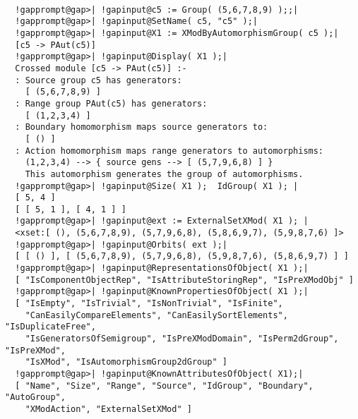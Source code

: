 \documentclass[a4paper,11pt]{report}
\begin{document}
{{ 
\begin{Verbatim}[commandchars=!@|,fontsize=\small,frame=single,label=Example]
  
  !gapprompt@gap>| !gapinput@c5 := Group( (5,6,7,8,9) );;|
  !gapprompt@gap>| !gapinput@SetName( c5, "c5" );|
  !gapprompt@gap>| !gapinput@X1 := XModByAutomorphismGroup( c5 );|
  [c5 -> PAut(c5)] 
  !gapprompt@gap>| !gapinput@Display( X1 );|
  Crossed module [c5 -> PAut(c5)] :-
  : Source group c5 has generators:
    [ (5,6,7,8,9) ]
  : Range group PAut(c5) has generators:
    [ (1,2,3,4) ]
  : Boundary homomorphism maps source generators to:
    [ () ]
  : Action homomorphism maps range generators to automorphisms:
    (1,2,3,4) --> { source gens --> [ (5,7,9,6,8) ] }
    This automorphism generates the group of automorphisms.
  !gapprompt@gap>| !gapinput@Size( X1 );  IdGroup( X1 ); |
  [ 5, 4 ]
  [ [ 5, 1 ], [ 4, 1 ] ]
  !gapprompt@gap>| !gapinput@ext := ExternalSetXMod( X1 ); |
  <xset:[ (), (5,6,7,8,9), (5,7,9,6,8), (5,8,6,9,7), (5,9,8,7,6) ]>
  !gapprompt@gap>| !gapinput@Orbits( ext );|
  [ [ () ], [ (5,6,7,8,9), (5,7,9,6,8), (5,9,8,7,6), (5,8,6,9,7) ] ]
  !gapprompt@gap>| !gapinput@RepresentationsOfObject( X1 );|
  [ "IsComponentObjectRep", "IsAttributeStoringRep", "IsPreXModObj" ]
  !gapprompt@gap>| !gapinput@KnownPropertiesOfObject( X1 );|
  [ "IsEmpty", "IsTrivial", "IsNonTrivial", "IsFinite", 
    "CanEasilyCompareElements", "CanEasilySortElements", "IsDuplicateFree", 
    "IsGeneratorsOfSemigroup", "IsPreXModDomain", "IsPerm2dGroup", "IsPreXMod", 
    "IsXMod", "IsAutomorphismGroup2dGroup" ]
  !gapprompt@gap>| !gapinput@KnownAttributesOfObject( X1);|
  [ "Name", "Size", "Range", "Source", "IdGroup", "Boundary", "AutoGroup", 
    "XModAction", "ExternalSetXMod" ]
  
\end{Verbatim}
      

}}
\end{document}
